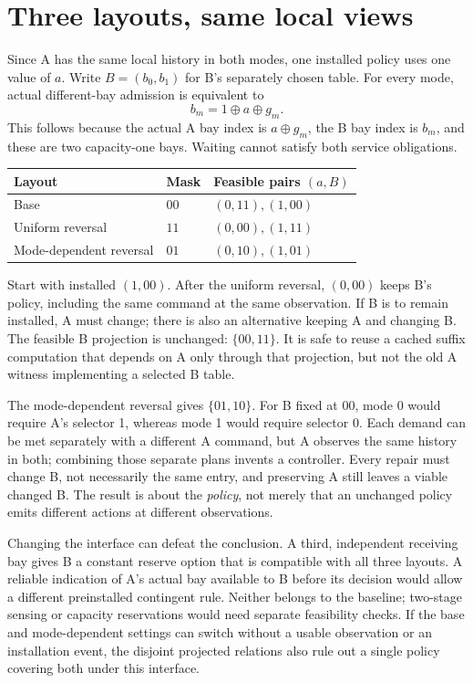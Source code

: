\documentclass[11pt]{article}
\begin{document}
\section{Three layouts, same local views}
Since A has the same local history in both modes, one installed policy uses one value of \(a\). Write \(B=(b_0,b_1)\) for B's separately chosen table. For every mode, actual different-bay admission is equivalent to
\[
                      b_m=1\oplus a\oplus g_m .
\]
This follows because the actual A bay index is \(a\oplus g_m\), the B bay index is \(b_m\), and these are two capacity-one bays. Waiting cannot satisfy both service obligations.

\begin{center}
\begin{tabular}{lll}
Layout & Mask & Feasible pairs \((a,B)\)\\\hline
Base & \(00\) & \((0,11),(1,00)\)\\
Uniform reversal & \(11\) & \((0,00),(1,11)\)\\
Mode-dependent reversal & \(01\) & \((0,10),(1,01)\)
\end{tabular}
\end{center}
Start with installed \((1,00)\). After the uniform reversal, \((0,00)\) keeps B's policy, including the same command at the same observation. If B is to remain installed, A must change; there is also an alternative keeping A and changing B. The feasible B projection is unchanged: \(\{00,11\}\). It is safe to reuse a cached suffix computation that depends on A only through that projection, but not the old A witness implementing a selected B table.

The mode-dependent reversal gives \(\{01,10\}\). For B fixed at \(00\), mode 0 would require A's selector 1, whereas mode 1 would require selector 0. Each demand can be met separately with a different A command, but A observes the same history in both; combining those separate plans invents a controller. Every repair must change B, not necessarily the same entry, and preserving A still leaves a viable changed B. The result is about the \emph{policy}, not merely that an unchanged policy emits different actions at different observations.

Changing the interface can defeat the conclusion. A third, independent receiving bay gives B a constant reserve option that is compatible with all three layouts. A reliable indication of A's actual bay available to B before its decision would allow a different preinstalled contingent rule. Neither belongs to the baseline; two-stage sensing or capacity reservations would need separate feasibility checks. If the base and mode-dependent settings can switch without a usable observation or an installation event, the disjoint projected relations also rule out a single policy covering both under this interface.
\end{document}
